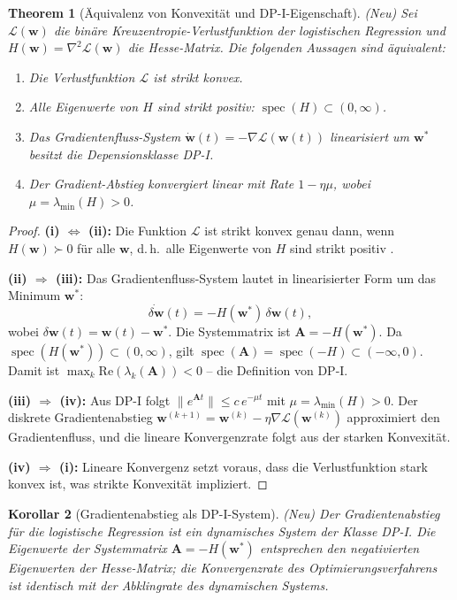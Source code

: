 ﻿\documentclass[12pt, a4paper]{article}
\newtheorem{theorem}{Theorem}[section]
\newtheorem{corollary}[theorem]{Korollar}
\theoremstyle{definition}
\theoremstyle{remark}
\newcommand{\vw}{\bm{w}}
\newcommand{\vA}{\bm{A}}
\newcommand{\re}{\mathrm{Re}}
\newcommand{\spec}{\operatorname{spec}}
\begin{document}
\begin{theorem}[Äquivalenz von Konvexität und DP-I-Eigenschaft]
\label{thm:konvex_aequiv}
\textup{(Neu)} Sei $\mathcal{L}(\vw)$ die binäre Kreuzentropie-Verlustfunktion
der logistischen Regression und $H(\vw) = \nabla^2\mathcal{L}(\vw)$ die Hesse-Matrix.
Die folgenden Aussagen sind äquivalent:
\begin{enumerate}[label=(\roman*)]
  \item Die Verlustfunktion $\mathcal{L}$ ist strikt konvex.
  \item Alle Eigenwerte von $H$ sind strikt positiv: $\spec(H) \subset (0, \infty)$.
  \item Das Gradientenfluss-System
    $\dot{\vw}(t) = -\nabla\mathcal{L}(\vw(t))$
    linearisiert um $\vw^*$ besitzt die Depensionsklasse DP-I.
  \item Der Gradient-Abstieg konvergiert linear mit Rate $1 - \eta\mu$, wobei
    $\mu = \lambda_{\min}(H) > 0$.
\end{enumerate}
\end{theorem}

\begin{proof}
  \textbf{(i) $\Leftrightarrow$ (ii):} Die Funktion $\mathcal{L}$ ist strikt konvex
  genau dann, wenn $H(\vw) \succ 0$ für alle $\vw$, d.\,h.\ alle Eigenwerte von
  $H$ sind strikt positiv \citep[Theorem~4.1]{epp2026logreg}.

  \textbf{(ii) $\Rightarrow$ (iii):} Das Gradientenfluss-System lautet in
  linearisierter Form um das Minimum $\vw^*$:
  \[
    \dot{\delta\vw}(t) = -H(\vw^*)\, \delta\vw(t),
  \]
  wobei $\delta\vw(t) = \vw(t) - \vw^*$. Die Systemmatrix ist $\vA = -H(\vw^*)$.
  Da $\spec(H(\vw^*)) \subset (0,\infty)$, gilt $\spec(\vA) = \spec(-H) \subset (-\infty, 0)$.
  Damit ist $\max_k\re(\lambda_k(\vA)) < 0$ -- die Definition von DP-I.

  \textbf{(iii) $\Rightarrow$ (iv):} Aus DP-I folgt $\|e^{\vA t}\| \leq c\,e^{-\mu t}$
  mit $\mu = \lambda_{\min}(H) > 0$. Der diskrete Gradientenabstieg $\vw^{(k+1)} =
  \vw^{(k)} - \eta\nabla\mathcal{L}(\vw^{(k)})$ approximiert den Gradientenfluss,
  und die lineare Konvergenzrate folgt aus der starken Konvexität.

  \textbf{(iv) $\Rightarrow$ (i):} Lineare Konvergenz setzt voraus, dass die
  Verlustfunktion stark konvex ist, was strikte Konvexität impliziert. \qedhere
\end{proof}

\begin{corollary}[Gradientenabstieg als DP-I-System]
\label{cor:gd_dp1}
\textup{(Neu)} Der Gradientenabstieg für die logistische Regression \emph{ist} ein
dynamisches System der Klasse DP-I. Die Eigenwerte der Systemmatrix $\vA = -H(\vw^*)$
entsprechen den negativierten Eigenwerten der Hesse-Matrix; die Konvergenzrate des
Optimierungsverfahrens ist identisch mit der Abklingrate des dynamischen Systems.
\end{corollary}
\end{document}
